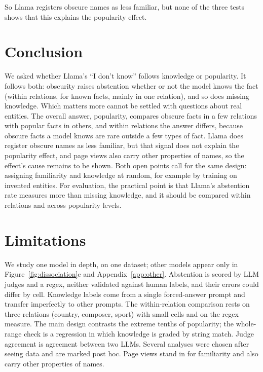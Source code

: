 \documentclass[11pt]{article}
\newcommand{\idk}{``I don't know''}
\begin{document}
So Llama registers obscure names as less familiar, but none of the three tests shows that this explains the popularity effect.

\section{Conclusion}

We asked whether Llama's \idk{} follows knowledge or popularity. It follows both: obscurity raises abstention whether or not the model knows the fact (within relations, for known facts, mainly in one relation), and so does missing knowledge. Which matters more cannot be settled with questions about real entities. The overall answer, popularity, compares obscure facts in a few relations with popular facts in others, and within relations the answer differs, because obscure facts a model knows are rare outside a few types of fact. Llama does register obscure names as less familiar, but that signal does not explain the popularity effect, and page views also carry other properties of names, so the effect's cause remains to be shown. Both open points call for the same design: assigning familiarity and knowledge at random, for example by training on invented entities. For evaluation, the practical point is that Llama's abstention rate measures more than missing knowledge, and it should be compared within relations and across popularity levels.

\section*{Limitations}

We study one model in depth, on one dataset; other models appear only in Figure~\ref{fig:dissociation}c and Appendix~\ref{app:other}. Abstention is scored by LLM judges and a regex, neither validated against human labels, and their errors could differ by cell. Knowledge labels come from a single forced-answer prompt and transfer imperfectly to other prompts. The within-relation comparison rests on three relations (country, composer, sport) with small cells and on the regex measure. The main design contrasts the extreme tenths of popularity; the whole-range check is a regression in which knowledge is graded by string match. Judge agreement is agreement between two LLMs. Several analyses were chosen after seeing data and are marked post hoc. Page views stand in for familiarity and also carry other properties of names.


\end{document}
